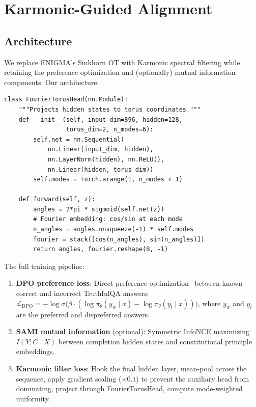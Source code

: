 \documentclass[11pt,a4paper]{article}
\begin{document}
\section{Karmonic-Guided Alignment}

\subsection{Architecture}

We replace ENIGMA's Sinkhorn OT with Karmonic spectral filtering while retaining the preference optimization and (optionally) mutual information components. Our architecture:

\begin{lstlisting}[caption={Karmonic alignment architecture (simplified)},label={lst:architecture}]
class FourierTorusHead(nn.Module):
    """Projects hidden states to torus coordinates."""
    def __init__(self, input_dim=896, hidden=128,
                 torus_dim=2, n_modes=6):
        self.net = nn.Sequential(
            nn.Linear(input_dim, hidden),
            nn.LayerNorm(hidden), nn.ReLU(),
            nn.Linear(hidden, torus_dim))
        self.modes = torch.arange(1, n_modes + 1)

    def forward(self, z):
        angles = 2*pi * sigmoid(self.net(z))
        # Fourier embedding: cos/sin at each mode
        n_angles = angles.unsqueeze(-1) * self.modes
        fourier = stack([cos(n_angles), sin(n_angles)])
        return angles, fourier.reshape(B, -1)
\end{lstlisting}

The full training pipeline:

\begin{enumerate}
    \item \textbf{DPO preference loss}: Direct preference optimization~\cite{rafailov2023dpo} between known correct and incorrect TruthfulQA answers: $\mathcal{L}_{\text{DPO}} = -\log\sigma\bigl(\beta \cdot (\log \pi_\theta(y_w \mid x) - \log \pi_\theta(y_l \mid x))\bigr)$, where $y_w$ and $y_l$ are the preferred and dispreferred answers.
    \item \textbf{SAMI mutual information} (optional): Symmetric InfoNCE maximizing $I(Y; C \mid X)$ between completion hidden states and constitutional principle embeddings.
    \item \textbf{Karmonic filter loss}: Hook the final hidden layer, mean-pool across the sequence, apply gradient scaling ($\times 0.1$) to prevent the auxiliary head from dominating, project through FourierTorusHead, compute mode-weighted uniformity.
\end{enumerate}
\end{document}
